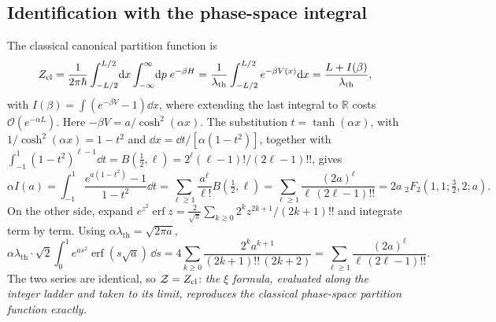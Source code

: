\documentclass[11pt]{article}
\numberwithin{equation}{section}
\providecommand{\erf}{\operatorname{erf}}
\newcommand{\lth}{\lambda_{\mathrm{th}}}
\begin{document}
\subsection{Identification with the phase-space integral}
The classical canonical partition function is
\begin{equation}
Z_{\rm cl}=\frac{1}{2\pi\hbar}\int_{-L/2}^{L/2}\!\dd x\int_{-\infty}^{\infty}\!\dd p\;e^{-\beta H}=\frac{1}{\lth}\int_{-L/2}^{L/2}e^{-\beta V(x)}\dd x=\frac{L+I(\beta)}{\lth},
\label{eq:Zcl}
\end{equation}
with $I(\beta)=\int\left(e^{-\beta V}-1\right)\dd x$, where extending the last integral to $\mathbb R$ costs $\mathcal O(e^{-\alpha L})$. Here $-\beta V=a/\cosh^2(\alpha x)$. The substitution $t=\tanh(\alpha x)$, with $1/\cosh^2(\alpha x)=1-t^2$ and $\dd x=\dd t/[\alpha(1-t^2)]$, together with $\int_{-1}^1(1-t^2)^{\ell-1}\dd t=B(\tfrac12,\ell)=2^\ell(\ell-1)!/(2\ell-1)!!$, gives
\begin{equation}
\alpha I(a)=\int_{-1}^{1}\frac{e^{a(1-t^2)}-1}{1-t^2}\dd t=\sum_{\ell\ge1}\frac{a^\ell}{\ell!}B\!\left(\tfrac12,\ell\right)=\sum_{\ell\ge1}\frac{(2a)^\ell}{\ell\,(2\ell-1)!!}=2a\;{}_2F_2\!\left(1,1;\tfrac32,2;a\right).
\label{eq:Iseries}
\end{equation}
On the other side, expand $e^{z^2}\erf z=\frac{2}{\sqrt\pi}\sum_{k\ge0}2^kz^{2k+1}/(2k+1)!!$ and integrate term by term. Using $\alpha\lth=\sqrt{2\pi a}$,
\begin{equation}
\alpha\lth\cdot\sqrt2\int_0^1e^{as^2}\erf(s\sqrt a)\,\dd s=4\sum_{k\ge0}\frac{2^ka^{k+1}}{(2k+1)!!\,(2k+2)}=\sum_{\ell\ge1}\frac{(2a)^\ell}{\ell\,(2\ell-1)!!}.
\end{equation}
The two series are identical, so $\mathcal Z=Z_{\rm cl}$: \emph{the $\xi$ formula, evaluated along the integer ladder and taken to its limit, reproduces the classical phase-space partition function exactly.}
\end{document}

